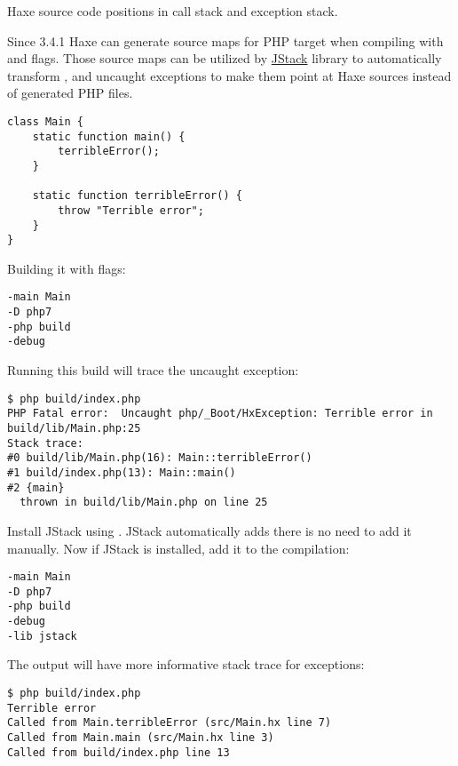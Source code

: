 Haxe source code positions in call stack and exception stack.

Since 3.4.1 Haxe can generate source maps for PHP target when compiling with  and  flags.
Those source maps can be utilized by \href{https://lib.haxe.org/p/jstack/}{JStack} library to automatically transform ,  and uncaught exceptions to make them point at Haxe sources instead of generated PHP files.


\begin{lstlisting}
class Main {
	static function main() {
		terribleError();
	}

	static function terribleError() {
		throw "Terrible error";
	}
}
\end{lstlisting}

Building it with flags:

\begin{lstlisting}
-main Main
-D php7
-php build
-debug
\end{lstlisting}

Running this build will trace the uncaught exception:

\begin{lstlisting}
$ php build/index.php
PHP Fatal error:  Uncaught php/_Boot/HxException: Terrible error in build/lib/Main.php:25
Stack trace:
#0 build/lib/Main.php(16): Main::terribleError()
#1 build/index.php(13): Main::main()
#2 {main}
  thrown in build/lib/Main.php on line 25
\end{lstlisting}

Install JStack using . JStack automatically adds  there is no need to add it manually.
Now if JStack is installed, add it to the compilation:

\begin{lstlisting}
-main Main
-D php7
-php build
-debug
-lib jstack
\end{lstlisting}

The output will have more informative stack trace for exceptions:

\begin{lstlisting}
$ php build/index.php
Terrible error
Called from Main.terribleError (src/Main.hx line 7)
Called from Main.main (src/Main.hx line 3)
Called from build/index.php line 13
\end{lstlisting}
